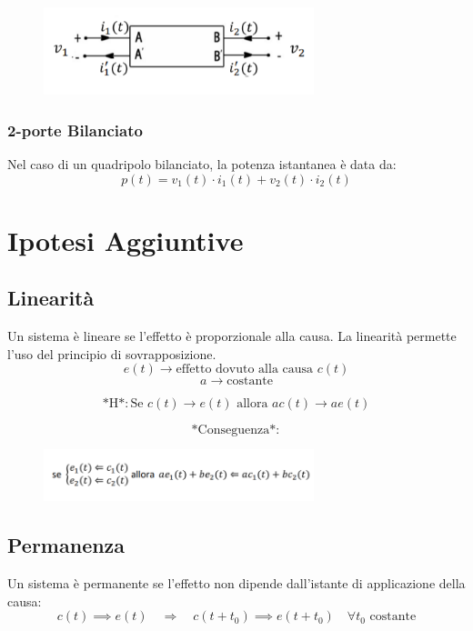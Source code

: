 \begin{figure}[H]
    \centering
    \includegraphics[width=0.7\textwidth]{capitoli/capitolo2/immagini/image8.png}
\end{figure}

\subsubsection*{2-porte Bilanciato}
Nel caso di un quadripolo bilanciato, la potenza istantanea è data da:
\[
p(t) = v_1(t) \cdot i_1(t) + v_2(t) \cdot i_2(t)
\]

\section{Ipotesi Aggiuntive}

\subsection*{Linearità}
Un sistema è lineare se l'effetto è proporzionale alla causa. La linearità permette l'uso del principio di sovrapposizione.
\[
e(t) \to \text{effetto dovuto alla causa } c(t)
\]
\[
a \to \text{costante}
\]

\[
\text{*H*}: \text{Se } c(t) \xrightarrow{} e(t) \text{ allora } ac(t) \xrightarrow{} ae(t)
\]

\[
\text{*Conseguenza*}: 
\]
\begin{figure}[h!]
    \centering
    \includegraphics[width=0.7\textwidth]{capitoli/capitolo2/immagini/image9.png}
\end{figure}

\subsection*{Permanenza}
Un sistema è permanente se l'effetto non dipende dall'istante di applicazione della causa:
\[
c(t) \implies e(t) \quad \Rightarrow \quad c(t+t_0) \implies e(t+t_0) \quad \forall t_0 \text{ costante}
\]

